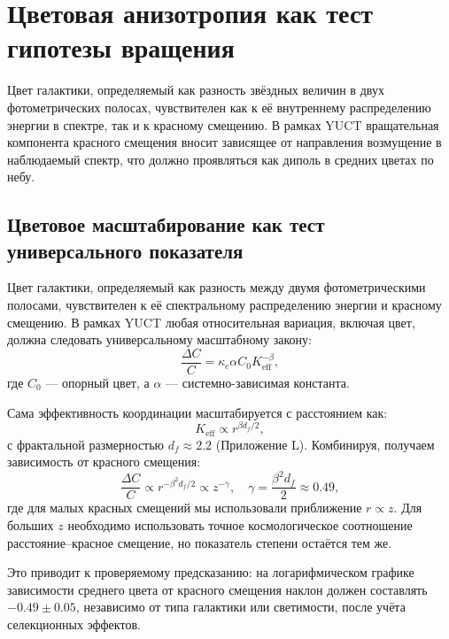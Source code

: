 \documentclass[11pt,a4paper]{article}
\begin{document}
	\section{Цветовая анизотропия как тест гипотезы вращения}
	
	Цвет галактики, определяемый как разность звёздных величин в двух фотометрических полосах, чувствителен как к её внутреннему распределению энергии в спектре, так и к красному смещению. В рамках YUCT вращательная компонента красного смещения вносит зависящее от направления возмущение в наблюдаемый спектр, что должно проявляться как диполь в средних цветах по небу.
	
	\subsection{Цветовое масштабирование как тест универсального показателя}
	
	Цвет галактики, определяемый как разность между двумя фотометрическими полосами, чувствителен к её спектральному распределению энергии и красному смещению. В рамках YUCT любая относительная вариация, включая цвет, должна следовать универсальному масштабному закону:
	\begin{equation}
		\frac{\Delta C}{C} = \kappa_c \alpha C_0 K_{\mathrm{eff}}^{-\beta},
	\end{equation}
	где \(C_0\) — опорный цвет, а \(\alpha\) — системно-зависимая константа.
	
	Сама эффективность координации масштабируется с расстоянием как:
	\begin{equation}
		K_{\mathrm{eff}} \propto r^{\beta d_f / 2},
	\end{equation}
	с фрактальной размерностью \(d_f \approx 2.2\) (Приложение L). Комбинируя, получаем зависимость от красного смещения:
	\begin{equation}
		\frac{\Delta C}{C} \propto r^{-\beta^2 d_f / 2} \propto z^{-\gamma}, \quad \gamma = \frac{\beta^2 d_f}{2} \approx 0.49,
	\end{equation}
	где для малых красных смещений мы использовали приближение \(r \propto z\). Для больших \(z\) необходимо использовать точное космологическое соотношение расстояние–красное смещение, но показатель степени остаётся тем же.
	
	Это приводит к проверяемому предсказанию: на логарифмическом графике зависимости среднего цвета от красного смещения наклон должен составлять \(-0.49 \pm 0.05\), независимо от типа галактики или светимости, после учёта селекционных эффектов.
	
\end{document}
